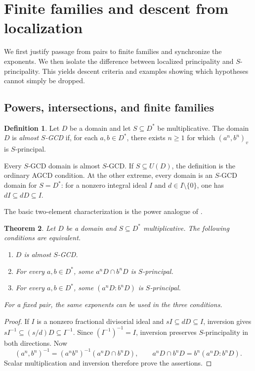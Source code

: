 \documentclass[11pt]{amsart}
\newtheorem{theorem}{Theorem}[section]
\theoremstyle{definition}
\newtheorem{definition}[theorem]{Definition}
\theoremstyle{remark}
\begin{document}
\section{Finite families and descent from localization}\label{sec:basic}

We first justify passage from pairs to finite families and synchronize
the exponents. We then isolate the difference between localized
principality and $S$-principality. This yields descent criteria and
examples showing which hypotheses cannot simply be dropped.

\subsection{Powers, intersections, and finite families}

\begin{definition}\label{d:almost-S}
Let $D$ be a domain and let $S\subseteq D^\ast$ be multiplicative.
The domain $D$ is \emph{almost $S$-GCD} if, for each $a,b\in D^\ast$,
there exists $n\geq1$ for which $(a^n,b^n)_v$ is $S$-principal.
\end{definition}

Every $S$-GCD domain is almost $S$-GCD. If $S\subseteq U(D)$, the
definition is the ordinary AGCD condition. At the other extreme,
every domain is an $S$-GCD domain for $S=D^\ast$: for a nonzero
integral ideal $I$ and $d\in I\setminus\{0\}$, one has
$dI\subseteq dD\subseteq I$.

The basic two-element characterization is the power analogue of
\cite[Theorem~2.1]{AHZ}.

\begin{theorem}\label{t1}
Let $D$ be a domain and $S\subseteq D^\ast$ multiplicative. The
following conditions are equivalent.
\begin{enumerate}
\item $D$ is almost $S$-GCD.
\item For every $a,b\in D^\ast$, some $a^nD\cap b^nD$ is $S$-principal.
\item For every $a,b\in D^\ast$, some $(a^nD:b^nD)$ is $S$-principal.
\end{enumerate}
For a fixed pair, the same exponents can be used in the three conditions.
\end{theorem}

\begin{proof}
If $I$ is a nonzero fractional divisorial ideal and
$sI\subseteq dD\subseteq I$, inversion gives
$sI^{-1}\subseteq(s/d)D\subseteq I^{-1}$.
Since $(I^{-1})^{-1}=I$, inversion preserves $S$-principality in
both directions. Now
\[
 (a^n,b^n)^{-1}=(a^nb^n)^{-1}(a^nD\cap b^nD),
 \qquad
 a^nD\cap b^nD=b^n(a^nD:b^nD).
\]
Scalar multiplication and inversion therefore prove the assertions.
\end{proof}
\end{document}
